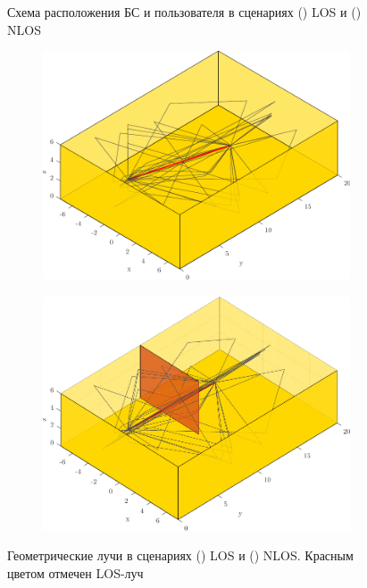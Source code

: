 \begin{figure}[ht]
\begin{subfigure}{0.49\linewidth}
    \caption{}
    \label{fig:4.30b}
  \end{subfigure}
  \caption{Схема расположения БС и пользователя в сценариях () LOS
    и () NLOS}
  \label{fig:4.30}
\end{figure}
\begin{figure}[H]
  \centering
  \begin{subfigure}{0.49\linewidth}
    \centering
    \includegraphics[width=\linewidth]{figs/4.30d.pdf}
    \caption{}
    \label{fig:4.30c}
  \end{subfigure}
  \begin{subfigure}{0.49\linewidth}
    \centering
    \includegraphics[width=\linewidth]{figs/4.30c.pdf}
    \caption{}
    \label{fig:4.30d}
  \end{subfigure}
  \caption{Геометрические лучи в сценариях () LOS
    и () NLOS. Красным цветом отмечен LOS-луч}
\end{figure}




